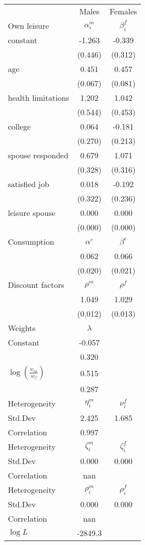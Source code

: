 \begin{tabular}{lcc} 
\hline\hline 
 & Males & Females \\ 
Own leisure & $\alpha_{i}^{m}$ & $\beta_{i}^{f}$ \\ 
constant & -1.263 & -0.339 \\ 
 & (0.446) & (0.312) \\ 
age & 0.451 & 0.457 \\ 
 & (0.067) & (0.081) \\ 
health limitations & 1.202 & 1.042 \\ 
 & (0.544) & (0.453) \\ 
college & 0.064 & -0.181 \\ 
 & (0.270) & (0.213) \\ 
spouse responded & 0.679 & 1.071 \\ 
 & (0.328) & (0.316) \\ 
satisfied job & 0.018 & -0.192 \\ 
 & (0.322) & (0.236) \\ 
leisure spouse & 0.000 & 0.000 \\ 
 & (0.000) & (0.000) \\ 
Consumption & $\alpha^{c}$ & $\beta^{c}$ \\ 
 & 0.062 & 0.066 \\ 
 & (0.020) & (0.021) \\ 
Discount factors & $\rho^m$ & $\rho^f$ \\ 
 & 1.049 & 1.029 \\ 
 & (0.012) & (0.013) \\ 
Weights & $\lambda$ &  \\ 
Constant & -0.057 &  \\ 
 & 0.320 &  \\ 
$\log(\frac{w_m}{w_f})$ & 0.515 &  \\ 
 & 0.287 &  \\ 
Heterogeneity & $\eta_i^m$ & $\nu_i^f$ \\ 
Std.Dev & 2.425 & 1.685 \\ 
Correlation & 0.997 &  \\ 
Heterogeneity & $\zeta_i^m$ & $\zeta_i^f$ \\ 
Std.Dev & 0.000 & 0.000 \\ 
Correlation & nan &  \\ 
Heterogeneity & $\rho_i^m$ & $\rho_i^f$ \\ 
Std.Dev & 0.000 & 0.000 \\ 
Correlation & nan &  \\ 
\hline 
$\log L$ & -2849.3 & \\ 
\hline \hline 
\end{tabular} 
